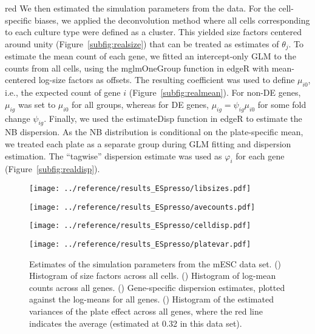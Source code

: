 \documentclass{article}
\begin{document}
\begin{color}{red}
We then estimated the simulation parameters from the data.
For the cell-specific biases, we applied the deconvolution method \citep{lun2016pooling} where all cells corresponding to each culture type were defined as a cluster.
This yielded size factors centered around unity (Figure~\ref{subfig:realsize}) that can be treated as estimates of $\theta_j$. 
To estimate the mean count of each gene, we fitted an intercept-only GLM to the counts from all cells, using the mglmOneGroup function in edgeR with mean-centered log-size factors as offsets.
The resulting coefficient was used to define $\mu_{i0}$, i.e., the expected count of gene $i$ (Figure~\ref{subfig:realmean}).
For non-DE genes, $\mu_{ig}$ was set to $\mu_{i0}$ for all groups, whereas for DE genes, $\mu_{ig} = \psi_{ig}\mu_{i0}$ for some fold change $\psi_{ig}$.
Finally, we used the estimateDisp function in edgeR to estimate the NB dispersion.
As the NB distribution is conditional on the plate-specific mean, we treated each plate as a separate group during GLM fitting and dispersion estimation.
The ``tagwise'' dispersion estimate was used as $\varphi_i$ for each gene (Figure~\ref{subfig:realdisp}).

\begin{figure}[p]
    \begin{minipage}{0.49\textwidth}
        \texttt{[image: ../reference/results\_ESpresso/libsizes.pdf]}
        \subcaption[]{}
        \label{subfig:realsize}
    \end{minipage}
    \begin{minipage}{0.49\textwidth}
        \texttt{[image: ../reference/results\_ESpresso/avecounts.pdf]}
        \subcaption[]{}
        \label{subfig:realmean}
    \end{minipage}
    \begin{minipage}{0.49\textwidth}
        \texttt{[image: ../reference/results\_ESpresso/celldisp.pdf]}
        \subcaption[]{}
        \label{subfig:realdisp}
    \end{minipage}
    \begin{minipage}{0.49\textwidth}
        \texttt{[image: ../reference/results\_ESpresso/platevar.pdf]}
        \subcaption[]{}
        \label{subfig:realplate}
    \end{minipage}
    \caption{Estimates of the simulation parameters from the mESC data set.
        () Histogram of size factors across all cells.
        () Histogram of log-mean counts across all genes.
        () Gene-specific dispersion estimates, plotted against the log-means for all genes.
        () Histogram of the estimated variances of the plate effect across all genes, where the red line indicates the average (estimated at 0.32 in this data set).
    }
\end{figure}


\end{color}
\end{document}
